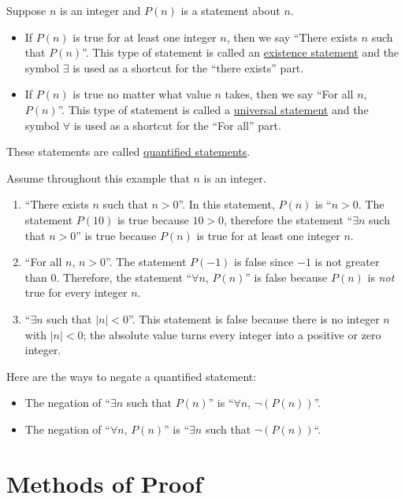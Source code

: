 Suppose $n$ is an integer and $P(n)$ is a statement about $n$. 
	\begin{itemize}
	\item If $P (n)$ is true for at least one integer $n$, then we say ``There exists $n$ such that $P (n)$''. This type of statement is called an \underline{existence statement} and the symbol $\exists$ is used as a shortcut for the ``there exists'' part.
	\item If $P(n)$ is true no matter what value $n$ takes, then we say ``For all $n$, $P (n)$''. This type of statement is called a \underline{universal statement} and the symbol $\forall$ is used as a shortcut for the ``For all'' part.
	\end{itemize}
These statements are called \underline{quantified statements}.

\begin{example} Assume throughout this example that $n$ is an integer.
	\begin{enumerate}[label=\alph*)]
		\item ``There exists $n$ such that $n > 0$''. In this statement, $P (n)$ is ``$n > 0$. The statement $P (10)$ is true because $10 > 0$, therefore the statement ``$\exists n$ such that $n > 0$'' is true because $P (n)$ is true for at least one integer $n$.
		\item ``For all $n$, $n > 0$''. The statement $P (-1)$ is false since $-1$ is not greater than $0$. Therefore, the statement ``$\forall n$, $P (n)$'' is false because $P(n)$ is \textit{not} true for every integer $n$.
		\item ``$\exists n$ such that $|n| < 0$''. This statement is false because there is no integer $n$ with $|n| < 0$; the absolute value turns every integer into a positive or zero integer.
	\end{enumerate}
\end{example}

Here are the ways to negate a quantified statement:
\begin{itemize}
	\item The negation of ``$\exists n$ such that $P (n)$'' is ``$\forall n$, $\neg (P (n))$''.
	\item The negation of ``$\forall n$, $P(n)$'' is ``$\exists n$ such that $\neg (P (n))$``.
\end{itemize}




\section{Methods of Proof}


